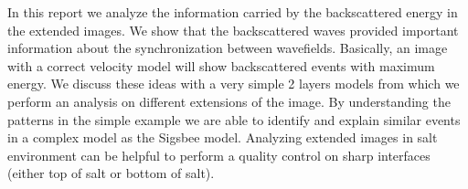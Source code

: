 In this report we analyze the information carried by the backscattered energy in the extended
 images. We show that the backscattered waves provided important information about the synchronization
 between wavefields. Basically, an image with a correct velocity model will show backscattered
 events with maximum energy. We discuss these ideas with a very simple 2 layers models from
 which we perform an analysis on different extensions of the image. By understanding the patterns
in the simple example we are able to identify and explain similar events in a complex model as the
Sigsbee model. Analyzing extended images in salt environment can be helpful to perform a quality
control on sharp interfaces (either top of salt or bottom of salt).


 



